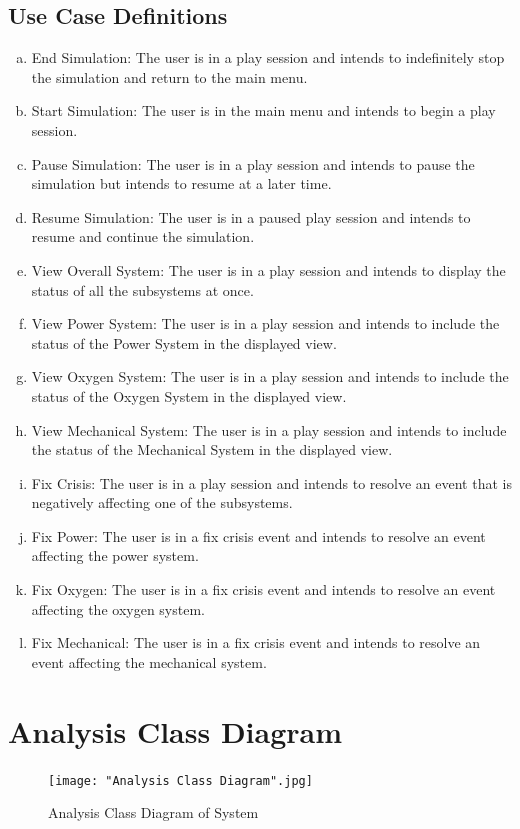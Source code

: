 \documentclass[12pt, titlepage]{article}
\begin{document}
\subsection*{Use Case Definitions}
\begin{enumerate}[a)]
	\item End Simulation: The user is in a play session and intends to indefinitely stop the simulation and return to the main menu.
	\item Start Simulation: The user is in the main menu and intends to begin a play session.
	\item Pause Simulation: The user is in a play session and intends to pause the simulation but intends to resume at a later time.
	\item Resume Simulation: The user is in a paused play session and intends to resume and continue the simulation.
	\item View Overall System: The user is in a play session and intends to display the status of all the subsystems at once.
	\item View Power System: The user is in a play session and intends to include the status of the Power System in the displayed view.
	\item View Oxygen System: The user is in a play session and intends to include the status of the Oxygen System in the displayed view.
	\item View Mechanical System: The user is in a play session and intends to include the status of the Mechanical System in the displayed view.
	\item Fix Crisis: The user is in a play session and intends to resolve an event that is negatively affecting one of the subsystems.
	\item Fix Power: The user is in a fix crisis event and intends to resolve an event affecting the power system.
	\item Fix Oxygen: The user is in a fix crisis event and intends to resolve an event affecting the oxygen system.
	\item Fix Mechanical: The user is in a fix crisis event and intends to resolve an event affecting the mechanical system.
\end{enumerate}
\newpage
\section{Analysis Class Diagram}
\label{sec:analysis_class_diagram}
\begin{figure}[ht!]
\centering
\texttt{[image: "Analysis Class Diagram".jpg]}
\caption{Analysis Class Diagram of System \label{analysisclass}}
\end{figure}
\end{document}
